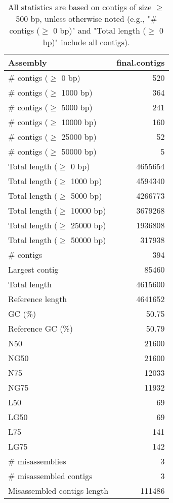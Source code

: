 \documentclass[12pt,a4paper]{article}
\begin{document}
\begin{table}[ht]
\begin{center}
\caption{All statistics are based on contigs of size $\geq$ 500 bp, unless otherwise noted (e.g., "\# contigs ($\geq$ 0 bp)" and "Total length ($\geq$ 0 bp)" include all contigs).}
\begin{tabular}{|l*{1}{|r}|}
\hline
Assembly & final.contigs \\ \hline
\# contigs ($\geq$ 0 bp) & 520 \\ \hline
\# contigs ($\geq$ 1000 bp) & 364 \\ \hline
\# contigs ($\geq$ 5000 bp) & 241 \\ \hline
\# contigs ($\geq$ 10000 bp) & 160 \\ \hline
\# contigs ($\geq$ 25000 bp) & 52 \\ \hline
\# contigs ($\geq$ 50000 bp) & 5 \\ \hline
Total length ($\geq$ 0 bp) & 4655654 \\ \hline
Total length ($\geq$ 1000 bp) & 4594340 \\ \hline
Total length ($\geq$ 5000 bp) & 4266773 \\ \hline
Total length ($\geq$ 10000 bp) & 3679268 \\ \hline
Total length ($\geq$ 25000 bp) & 1936808 \\ \hline
Total length ($\geq$ 50000 bp) & 317938 \\ \hline
\# contigs & 394 \\ \hline
Largest contig & 85460 \\ \hline
Total length & 4615600 \\ \hline
Reference length & 4641652 \\ \hline
GC (\%) & 50.75 \\ \hline
Reference GC (\%) & 50.79 \\ \hline
N50 & 21600 \\ \hline
NG50 & 21600 \\ \hline
N75 & 12033 \\ \hline
NG75 & 11932 \\ \hline
L50 & 69 \\ \hline
LG50 & 69 \\ \hline
L75 & 141 \\ \hline
LG75 & 142 \\ \hline
\# misassemblies & 3 \\ \hline
\# misassembled contigs & 3 \\ \hline
Misassembled contigs length & 111486 \\ \hline

\end{tabular}
\end{center}
\end{table}
\end{document}
